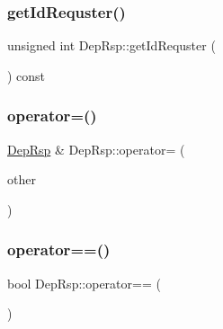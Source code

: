 \mbox{\label{classDepRsp_a3c858b0cb735e9e6309e8bf25bf272dd}} 
\subsubsection{\texorpdfstring{get\+Id\+Requster()}{getIdRequster()}}
{\footnotesize\ttfamily unsigned int Dep\+Rsp\+::get\+Id\+Requster (\begin{DoxyParamCaption}{ }\end{DoxyParamCaption}) const\hspace{0.3cm}{\ttfamily [virtual]}}

\mbox{\label{classDepRsp_a3297f65b6eb05d7d5d203562b4d48c4a}} 
\subsubsection{\texorpdfstring{operator=()}{operator=()}}
{\footnotesize\ttfamily \hyperlink{classDepRsp}{Dep\+Rsp} \& Dep\+Rsp\+::operator= (\begin{DoxyParamCaption}\item[{const \hyperlink{classDepRsp}{Dep\+Rsp} \&}]{other }\end{DoxyParamCaption})}

\mbox{\label{classDepRsp_a4796a7a035aa6f4b9deb40498731a941}} 
\subsubsection{\texorpdfstring{operator==()}{operator==()}}
{\footnotesize\ttfamily bool Dep\+Rsp\+::operator== (\begin{DoxyParamCaption}\item[{const \hyperlink{classDepRsp}{Dep\+Rsp} \&}]{ }\end{DoxyParamCaption})\hspace{0.3cm}{\ttfamily [protected]}}

\mbox{\label{classDepRsp_a2125eed5bc70db3cc55e41e144c8716f}} 
